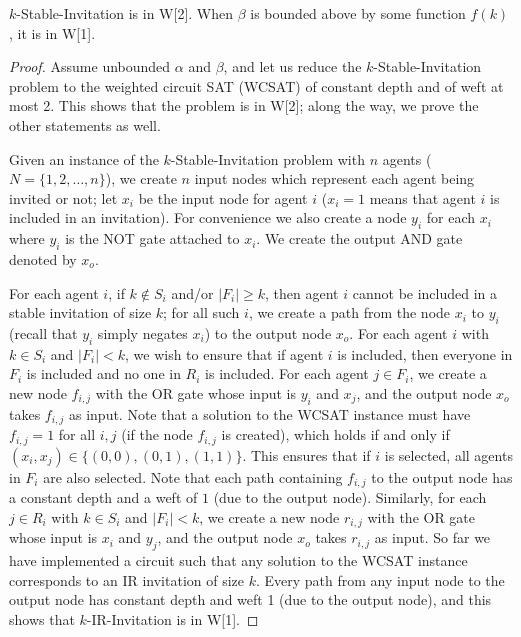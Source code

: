 \begin{theorem} \label{SIP:thm:stable_W2}
	$k$-Stable-Invitation is in W[2]. When $\beta$ is bounded above by some function $f(k)$, it is in W[1].
\end{theorem}
\begin{proof}
	Assume unbounded $\alpha$ and $\beta$, and let us reduce the $k$-Stable-Invitation problem to the weighted circuit SAT (WCSAT) of constant depth and of weft at most 2. This shows that the problem is in W[2]; along the way, we prove the other statements as well.

	Given an instance of the $k$-Stable-Invitation problem with $n$ agents ($N = \{1, 2, \dots, n\}$), we create $n$ input nodes which represent each agent being invited or not; let $x_i$ be the input node for agent $i$ ($x_i = 1$ means that agent $i$ is included in an invitation). For convenience we also create a node $y_i$ for each $x_i$ where $y_i$ is the NOT gate attached to $x_i$. We create the output AND gate denoted by $x_o$. 
	
	For each agent $i$, if $k\not\in S_i$ and/or $|F_i| \geq k$, then agent $i$ cannot be included in a stable invitation of size $k$; for all such $i$, we create a path from the node $x_i$ to $y_i$ (recall that $y_i$ simply negates $x_i$) to the output node $x_o$.
	For each agent $i$ with $k \in S_i$ and $|F_i| < k$, we wish to ensure that if agent $i$ is included, then everyone in $F_i$ is included and no one in $R_i$ is included. For each agent $j\in F_i$, we create a new node $f_{i,j}$ with the OR gate whose input is $y_i$ and $x_j$, and the output node $x_o$ takes $f_{i,j}$ as input. Note that a solution to the WCSAT instance must have $f_{i,j} = 1$ for all $i,j$ (if the node $f_{i,j}$ is created), which holds if and only if $(x_i, x_j) \in \{(0,0), (0,1), (1,1)\}$. This ensures that if $i$ is selected, all agents in $F_i$ are also selected. Note that each path containing $f_{i,j}$ to the output node has a constant depth and a weft of $1$ (due to the output node). Similarly, for each $j\in R_i$ with $k\in S_i$ and $|F_i| < k$, we create a new node $r_{i,j}$ with the OR gate whose input is $x_i$ and $y_j$, and the output node $x_o$ takes $r_{i,j}$ as input. 
	So far we have implemented a circuit such that any solution to the WCSAT instance corresponds to an IR invitation of size $k$. Every path from any input node to the output node has constant depth and weft 1 (due to the output node), and this shows that $k$-IR-Invitation is in W[1]. 
	

\end{proof}
